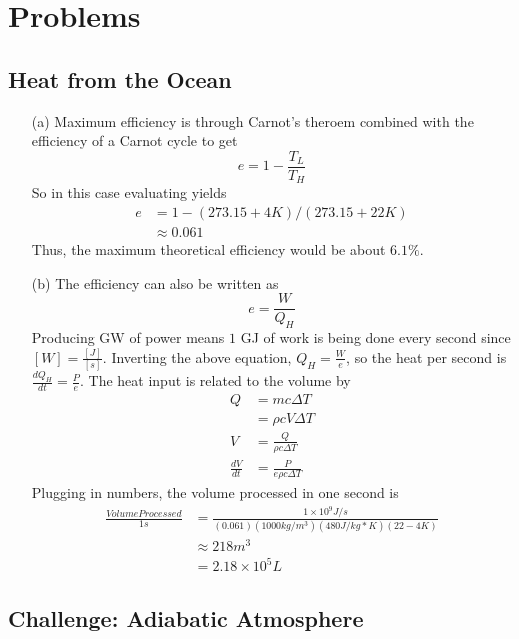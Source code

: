 \documentclass{article}
\begin{document}
\newpage

\section{Problems}

\subsection{Heat from the Ocean}

\begin{itemize}
	\item[(a)] Maximum efficiency is through Carnot's theroem combined with the efficiency of a Carnot cycle to get
	\begin{equation}
	e = 1-\frac{T_L}{T_H}
	\end{equation}
	So in this case evaluating yields
	\begin{align*}
	e &= 1-(273.15+4 K)/(273.15+22 K) \\
	&\approx 0.061
	\end{align*}
	Thus, the maximum theoretical efficiency would be about $6.1\%$.
	\item[(b)] The efficiency can also be written as
	\begin{equation}
	e = \frac{W}{Q_H}
	\end{equation}
	Producing GW of power means $1$ GJ of work is being done every second since $[W] = \frac{[J]}{[s]}$. Inverting the above equation, $Q_H = \frac{W}{e}$, so the heat per second is $\frac{dQ_H}{dt} = \frac{P}{e}$. The heat input is related to the volume by
	\begin{align*}
	Q &= mc\Delta T \\
	&= \rho cV\Delta T \\
	V &= \frac{Q}{\rho c\Delta T} \\
	\frac{dV}{dt} &= \frac{P}{e\rho c\Delta T}
	\end{align*}
	Plugging in numbers, the volume processed in one second is
	\begin{align*}
	\frac{Volume Processed}{1 s} &= \frac{1\times10^9 J/s}{(0.061)(1000 kg/m^3)(480 J/kg*K)(22-4 K)} \\
	&\approx 218 m^3 \\
	&= 2.18\times 10^5 L
	\end{align*}
\end{itemize}

\subsection{Challenge: Adiabatic Atmosphere}
\end{document}
